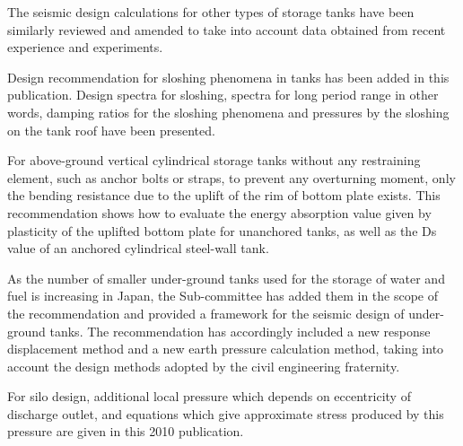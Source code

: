 \documentclass[base=10pt,magstyle=real,a4paper,twocolumn,xelatex,pandoc,jafont=ms]{bxjsarticle}
\begin{document}
The seismic design calculations for other types of storage tanks have been similarly reviewed and amended to take into account data obtained from recent experience and experiments.

Design recommendation for sloshing phenomena in tanks has been added in this publication. Design spectra for sloshing, spectra for long period range in other words, damping ratios for the sloshing phenomena and pressures by the sloshing on the tank roof have been presented.

For above-ground vertical cylindrical storage tanks without any restraining element, such as anchor bolts or straps, to prevent any overturning moment, only the bending resistance due to the uplift of the rim of bottom plate exists. This recommendation shows how to evaluate the energy absorption value given by plasticity of the uplifted bottom plate for unanchored tanks, as well as the Ds value of an anchored cylindrical steel-wall tank.

As the number of smaller under-ground tanks used for the storage of water and fuel is increasing in Japan, the Sub-committee has added them in the scope of the recommendation and provided a framework for the seismic design of under-ground tanks. The recommendation has accordingly included a new response displacement method and a new earth pressure calculation method, taking into account the design methods adopted by the civil engineering fraternity.

For silo design, additional local pressure which depends on eccentricity of discharge outlet, and equations which give approximate stress produced by this pressure are given in this 2010 publication.

\par
\egroup
\end{document}
